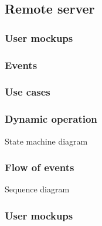 %
\subsection{Remote server}
\label{sec:remote-serv-decomp}

\subsubsection{User mockups}
\label{sec:user-mockups-1}

\subsubsection{Events}
\label{sec:events-2}

\subsubsection{Use cases}
\label{sec:use-cases-2}

\subsubsection{Dynamic operation}
\label{sec:dyn-oper-2}
State machine diagram

\subsubsection{Flow of events}
\label{sec:flow-events-2}
Sequence diagram

\subsubsection{User mockups}
\label{sec:user-mockups-2}

